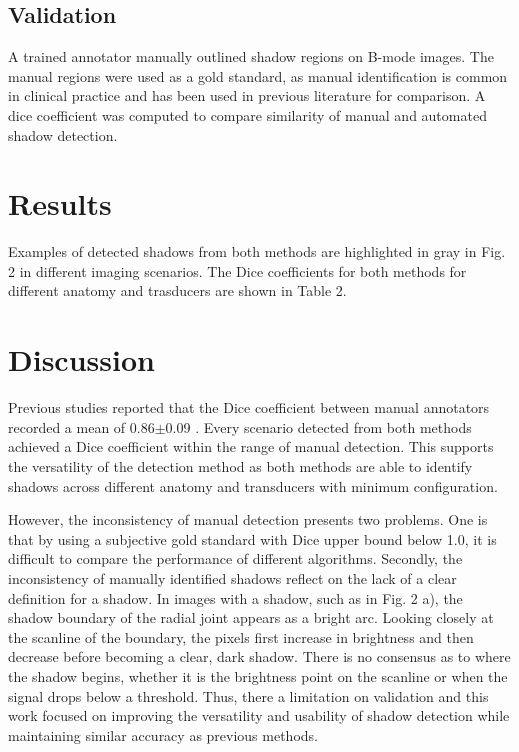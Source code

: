 \documentclass[preprint,5p,authoryear]{elsarticle}
\begin{document}
\subsection*{Validation}

A trained annotator manually outlined shadow regions on B-mode images. The manual regions were used as a gold standard, as manual identification is common in clinical practice and has been used in previous literature for comparison. A dice coefficient was computed to compare similarity of manual and automated shadow detection.

\section*{Results}
\label{Results}
Examples of detected shadows from both methods are highlighted in gray in Fig. 2 in different imaging scenarios. The Dice coefficients for both methods for different anatomy and trasducers are shown in Table 2. 

\section*{Discussion}
\label{Discuss}
Previous studies reported that the Dice coefficient between manual annotators recorded a mean of 0.86$\pm$0.09 \citep{Hellier2010} . Every scenario detected from both methods achieved a Dice coefficient within the range of manual detection. This supports the versatility of the detection method as both methods are able to identify shadows across different anatomy and transducers with minimum configuration. 

However, the inconsistency of manual detection presents two problems. One is that by using a subjective gold standard with Dice upper bound below 1.0, it is difficult to compare the performance of different algorithms. Secondly, the inconsistency of manually identified shadows reflect on the lack of a clear definition for a shadow. In images with a shadow, such as in Fig. 2 a), the shadow boundary of the radial joint appears as a bright arc. Looking closely at the scanline of the boundary, the pixels first increase in brightness and then decrease before becoming a clear, dark shadow. There is no consensus as to where the shadow begins, whether it is the brightness point on the scanline or when the signal drops below a threshold. Thus, there a limitation on validation and this work focused on improving the versatility and usability of shadow detection while maintaining similar accuracy as previous methods.
\end{document}
